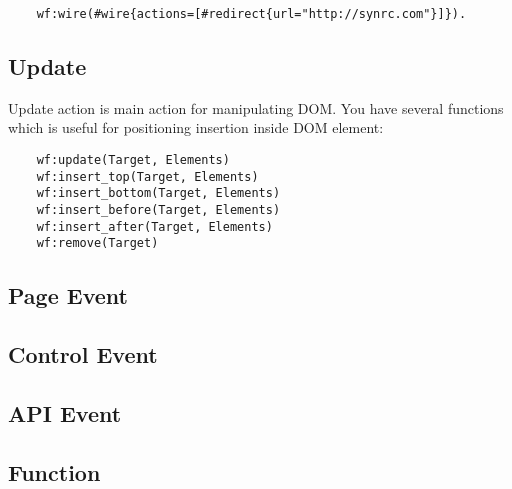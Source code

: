 \vspace{1\baselineskip}
\begin{lstlisting}
    wf:wire(#wire{actions=[#redirect{url="http://synrc.com"}]}).
\end{lstlisting}
\vspace{1\baselineskip}

\subsection{Update}
Update action is main action for manipulating DOM. You have several functions
which is useful for positioning insertion inside DOM element:

\vspace{1\baselineskip}
\begin{lstlisting}
    wf:update(Target, Elements)
    wf:insert_top(Target, Elements)
    wf:insert_bottom(Target, Elements)
    wf:insert_before(Target, Elements)
    wf:insert_after(Target, Elements)
    wf:remove(Target)
\end{lstlisting}
\vspace{1\baselineskip}

\subsection{Page Event}

\subsection{Control Event}

\subsection{API Event}

\subsection{Function}
